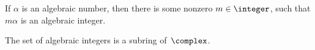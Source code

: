 %

\begin{prop}
 If $\alpha$ is an algebraic number, then there is some
nonzero $m \in \integer$, such that $m \alpha$ is an
algebraic integer.
 \end{prop}



\begin{prop}
 The set of algebraic integers is a subring of\/~$\complex$.
 \end{prop}

